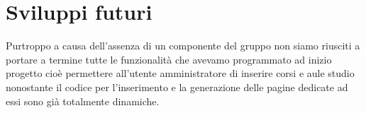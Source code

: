\section{Sviluppi futuri}
Purtroppo a causa dell'assenza di un componente del gruppo non siamo riusciti a portare a termine tutte le funzionalità che avevamo programmato ad inizio progetto cioè permettere all'utente amministratore di inserire corsi e aule studio nonostante il codice per l'inserimento e la generazione delle pagine dedicate ad essi sono già totalmente dinamiche.
